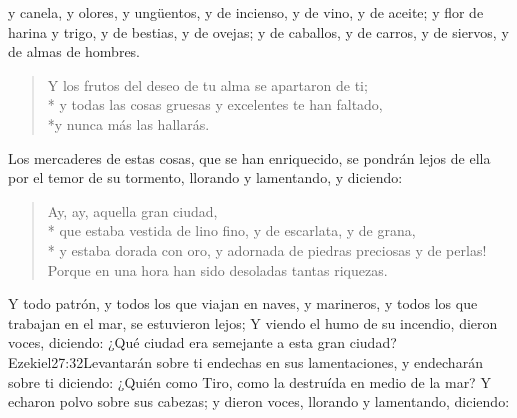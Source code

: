 y canela, y olores, y ungüentos, y de incienso, y de vino, y de aceite; y flor de harina y trigo, y de bestias, y de ovejas; y de caballos, y de carros, y de siervos, y de almas de hombres. 
\begin{verse}
	Y los frutos del deseo de tu alma se apartaron de ti;\\* y todas las cosas gruesas y excelentes te han faltado,\\*\vin y nunca más las hallarás. 
\end{verse}
Los mercaderes de estas cosas, que se han enriquecido, se pondrán lejos de ella por el temor de su tormento, llorando y lamentando,
y diciendo:
\begin{verse}
Ay, ay, aquella gran ciudad,\\*\vin
que estaba vestida de lino fino, y de escarlata, y de grana,\\*\vin
y estaba dorada con oro, y adornada de piedras preciosas y de perlas!\\ 
 Porque en una hora han sido desoladas tantas riquezas.
\end{verse}
 Y todo patrón, y todos los que viajan en naves, y marineros, y todos los que trabajan en el mar, se estuvieron lejos;%
Y viendo el humo de su incendio,%
 dieron voces, diciendo: ¿Qué ciudad era semejante a esta gran ciudad?%
				  {Ezekiel}{27:32}{Levantarán sobre ti endechas en sus lamentaciones, y endecharán sobre ti diciendo: ¿Quién como Tiro, como la destruída en medio de la mar?}
Y echaron polvo sobre sus cabezas; y dieron voces, llorando y lamentando, diciendo:
